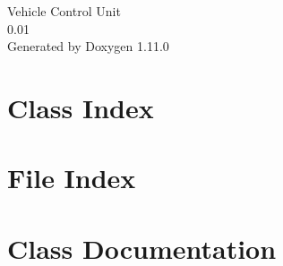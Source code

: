 \documentclass[twoside]{book}
\newcommand{\+}{\discretionary{\mbox{\scriptsize$\hookleftarrow$}}{}{}}
\newcommand{\clearemptydoublepage}{%
    \newpage{\pagestyle{empty}\cleardoublepage}%
  }
\begin{document}
  \raggedbottom
    \hypersetup{pageanchor=false,
                bookmarksnumbered=true,
                pdfencoding=unicode
               }
  \begin{titlepage}
  \vspace*{7cm}
  \begin{center}%
  {\Large Vehicle Control Unit}\\
  [1ex]\large 0.\+01 \\
  \vspace*{1cm}
  {\large Generated by Doxygen 1.11.0}\\
  \end{center}
  \end{titlepage}
  \clearemptydoublepage
  \tableofcontents
  \clearemptydoublepage
  \hypersetup{pageanchor=true}
\chapter{Class Index}

\chapter{File Index}

\chapter{Class Documentation}






























\end{document}
